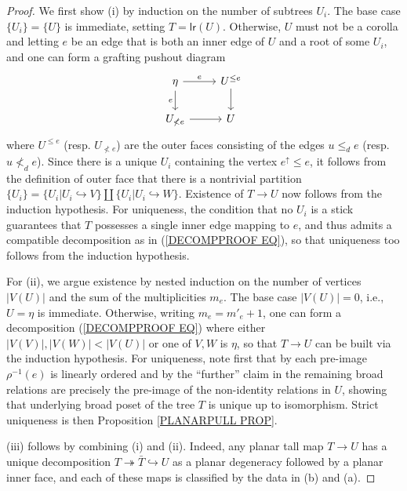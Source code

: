 \documentclass[a4paper,10pt]{article}%
\begin{document}
\begin{proof}
	We first show (i) by induction on the number of subtrees $U_i$. The base case $\{U_i\}=\{U\}$ is immediate, setting 
	$T= \mathsf{lr}(U)$. Otherwise, $U$ must not be a corolla and letting $e$ be an edge that is both an inner edge of $U$ and a root of some $U_i$, and one can form a grafting pushout diagram
\begin{equation} \label{DECOMPPROOF EQ}
\begin{tikzcd}
	\eta \ar{r}{e} \ar{d}[swap]{e} & U^{\leq e} \ar{d}
\\
	U_{\nless e} \ar{r} & U
\end{tikzcd}
\end{equation}
where $U^{\leq e}$ (resp. $U_{\nless e}$) are the outer faces consisting of the edges $u \leq_d e$ (resp. $u \nless_d e$).
Since there is a unique $U_i$ containing the vertex $e^{\uparrow} \leq e$, 
it follows from the definition of outer face that there is a
nontrivial partition 
$\{U_i\} = \{U_i|U_i \hookrightarrow V\} 
\amalg \{U_i|U_i \hookrightarrow W\}$. Existence of $T \to U$ now follows from the induction hypothesis. For uniqueness, the condition that no $U_i$ is a stick guarantees that $T$ possesses a single inner edge mapping to $e$, and thus admits a compatible decomposition as in (\ref{DECOMPPROOF EQ}), so that uniqueness too follows from the induction hypothesis.

For (ii), we argue existence by nested induction on the number of vertices $|V(U)|$ and the sum of the multiplicities $m_e$. The base case $|V(U)|=0$, i.e., $U = \eta$ is immediate. Otherwise, writing $m_e = m'_e +1$, one can form a decomposition (\ref{DECOMPPROOF EQ}) where either $|V(V)|,|V(W)|<|V(U)|$ or one of $V,W$ is $\eta$, so that $T \to U$ can be built via the induction hypothesis. For uniqueness, note first that 
by \cite[Lemma 5.33]{Pe17} each pre-image $\rho^{-1}(e)$ is linearly ordered and by the ``further'' claim in 
\cite[Cor. 5.39]{Pe17} the remaining broad relations are precisely the pre-image of the non-identity relations in $U$, showing that underlying broad poset of the tree $T$ is unique  up to isomorphism. Strict uniqueness is then 
Proposition \ref{PLANARPULL PROP}.

(iii) follows by combining (i) and (ii). Indeed, any planar tall map $T \to U$ has a unique decomposition 
$T \twoheadrightarrow \bar{T} \hookrightarrow U$
as a planar degeneracy followed by a planar inner face, and each  of these maps is classified by the data in (b) and (a).
\end{proof}
\end{document}
